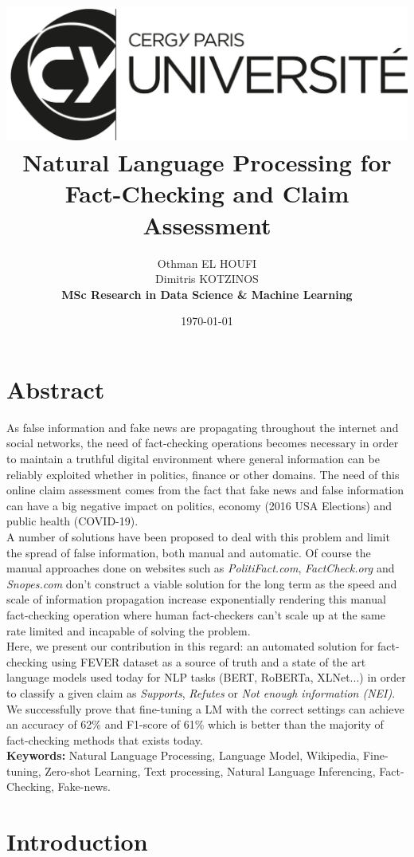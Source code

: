\documentclass[10pt, english]{report}
\title{
	\includegraphics[scale=1]{img/logo.png}\\[4cm]
	\huge\textbf{Natural Language Processing for Fact-Checking and Claim Assessment}\\[3cm]
}
\author{
	Othman EL HOUFI\\
	Dimitris KOTZINOS \\[0.5cm]
	\textbf{MSc Research in Data Science \& Machine Learning} \\[2cm]
}
\date{\today}
\begin{document}
	
	\begin{titlepage}
		\maketitle
	\end{titlepage}

\chapter*{Abstract}
As false information and fake news are propagating throughout the internet and social networks, the need of fact-checking operations becomes necessary in order to maintain a truthful digital environment where general information can be reliably exploited whether in politics, finance or other domains. The need of this online claim assessment comes from the fact that fake news and false information can have a big negative impact on politics, economy (2016 USA Elections) and public health (COVID-19).\\ 
A number of solutions have been proposed to deal with this problem and limit the spread of false information, both manual and automatic. Of course the manual approaches done on websites such as \textit{PolitiFact.com}, \textit{FactCheck.org} and \textit{Snopes.com} don't construct a viable solution for the long term as the speed and scale of information propagation increase exponentially rendering this manual fact-checking operation where human fact-checkers can't scale up at the same rate limited and incapable of solving the problem.\\
Here, we present our contribution in this regard: an automated solution for fact-checking using FEVER dataset as a source of truth and a state of the art language models used today for NLP tasks (BERT, RoBERTa, XLNet...) in order to classify a given claim as \textit{Supports}, \textit{Refutes} or \textit{Not enough information (NEI)}. We successfully prove that fine-tuning a LM with the correct settings can achieve an accuracy of 62\% and F1-score of 61\% which is better than the majority of fact-checking methods that exists today.\\[1cm]

\textbf{Keywords:} Natural Language Processing, Language Model, Wikipedia, Fine-tuning, Zero-shot Learning, Text processing, Natural Language Inferencing, Fact-Checking, Fake-news.

\tableofcontents

\chapter{Introduction}
\end{document}
